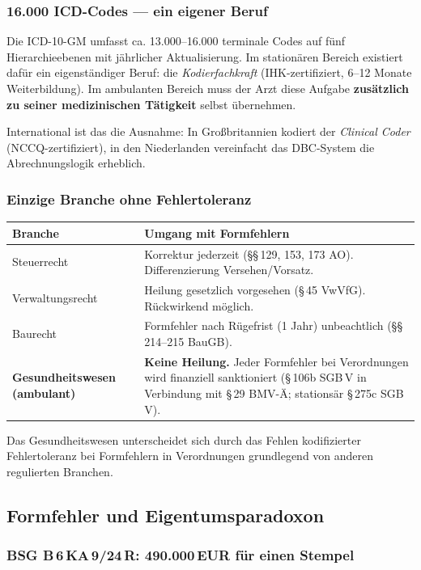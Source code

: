 \documentclass{umbruch-position}
\begin{document}
\subsubsection{16.000 ICD-Codes — ein eigener Beruf}

Die ICD-10-GM umfasst ca. 13.000--16.000 terminale Codes auf fünf Hierarchieebenen mit jährlicher Aktualisierung. Im stationären Bereich existiert dafür ein eigenständiger Beruf: die \textit{Kodierfachkraft} (IHK-zertifiziert, 6--12 Monate Weiterbildung). Im ambulanten Bereich muss der Arzt diese Aufgabe \textbf{zusätzlich zu seiner medizinischen Tätigkeit} selbst übernehmen.

International ist das die Ausnahme: In Großbritannien kodiert der \textit{Clinical Coder} (NCCQ-zertifiziert), in den Niederlanden vereinfacht das DBC-System die Abrechnungslogik erheblich.

\subsubsection{Einzige Branche ohne Fehlertoleranz}

{\small
\begin{tabularx}{\textwidth}{X X}
\toprule
\textbf{Branche} & \textbf{Umgang mit Formfehlern} \\
\midrule
Steuerrecht & Korrektur jederzeit (\S\S\,129, 153, 173 AO). Differenzierung Versehen/Vorsatz. \\
Verwaltungsrecht & Heilung gesetzlich vorgesehen (\S\,45 VwVfG). Rückwirkend möglich. \\
Baurecht & Formfehler nach Rügefrist (1 Jahr) unbeachtlich (\S\S\,214--215 BauGB). \\
\textbf{Gesundheitswesen (ambulant)} & \textbf{Keine Heilung.} Jeder Formfehler bei Verordnungen wird finanziell sanktioniert (\S\,106b SGB\,V in Verbindung mit \S\,29 BMV-\"A; stations\"ar \S\,275c SGB\,V). \\
\bottomrule
\end{tabularx}
}

Das Gesundheitswesen unterscheidet sich durch das Fehlen kodifizierter Fehlertoleranz bei Formfehlern in Verordnungen grundlegend von anderen regulierten Branchen.


\subsection{Formfehler und Eigentumsparadoxon}

\subsubsection{BSG B\,6\,KA\,9/24\,R: 490.000\,EUR für einen Stempel}
\end{document}
